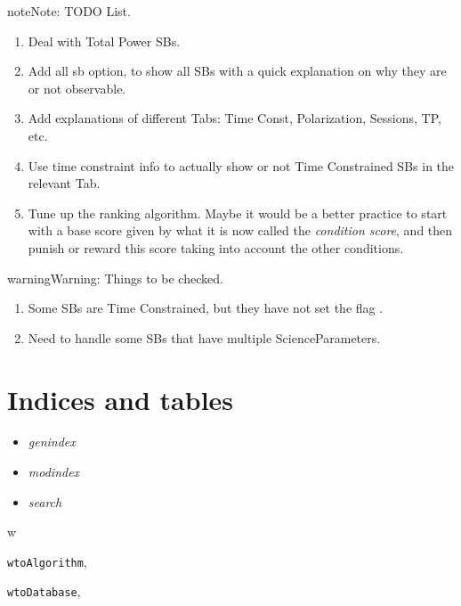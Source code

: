 \documentclass[a4paper,10pt,english]{sphinxmanual}
\begin{document}
\begin{notice}{note}{Note:}
TODO List.
\begin{enumerate}
\item {} 
Deal with Total Power SBs.

\item {} 
Add all sb option, to show all SBs with a quick explanation on why they are
or not observable.

\item {} 
Add explanations of different Tabs: Time Const, Polarization, Sessions, TP,
etc.

\item {} 
Use time constraint info to actually show or not Time Constrained SBs in the
relevant Tab.

\item {} 
Tune up the ranking algorithm. Maybe it would be a better practice to start
with a base score given by what it is now called the \emph{condition score}, and
then punish or reward this score taking into account the other conditions.

\end{enumerate}
\end{notice}

\begin{notice}{warning}{Warning:}
Things to be checked.
\begin{enumerate}
\item {} 
Some SBs are Time Constrained, but they have not set the flag
.

\item {} 
Need to handle some SBs that have multiple ScienceParameters.

\end{enumerate}
\end{notice}


\chapter{Indices and tables}
\label{index:indices-and-tables}\begin{itemize}
\item {} 
\emph{genindex}

\item {} 
\emph{modindex}

\item {} 
\emph{search}

\end{itemize}


\renewcommand{\indexname}{Python Module Index}
\begin{theindex}
\def\bigletter#1{{\Large\sffamily#1}\nopagebreak\vspace{1mm}}
\bigletter{w}
\item {\texttt{wtoAlgorithm}}, \pageref{wtoapi:module-wtoAlgorithm}
\item {\texttt{wtoDatabase}}, \pageref{wtoapi:module-wtoDatabase}
\end{theindex}

\renewcommand{\indexname}{Index}
\printindex
\end{document}

